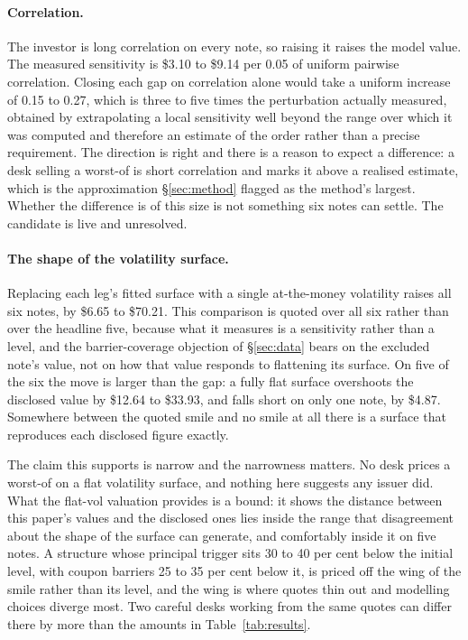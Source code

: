 \paragraph{Correlation.} The investor is long correlation on every note, so
raising it raises the model value. The measured sensitivity is \$3.10 to \$9.14
per 0.05 of uniform pairwise correlation. Closing each gap on correlation alone
would take a uniform increase of 0.15 to 0.27, which is three to five times the
perturbation actually measured, obtained by extrapolating a local sensitivity
well beyond the range over which it was computed and therefore an estimate of
the order rather than a precise requirement. The direction is right and there is
a reason to expect a difference: a desk selling a worst-of is short correlation
and marks it above a realised estimate, which is the approximation
\S\ref{sec:method} flagged as the method's largest. Whether the difference is
of this size is not something six notes can settle. The candidate is live and
unresolved.

\paragraph{The shape of the volatility surface.} Replacing each leg's fitted
surface with a single at-the-money volatility raises all six notes, by \$6.65
to \$70.21. This comparison is quoted over all six rather than over the
headline five, because what it measures is a sensitivity rather than a level,
and the barrier-coverage objection of \S\ref{sec:data} bears on the excluded
note's value, not on how that value responds to flattening its surface. On five
of the six the move is larger than the gap: a fully flat surface overshoots the
disclosed value by \$12.64 to \$33.93, and falls short on only one note, by
\$4.87. Somewhere between the quoted smile and no smile at all
there is a surface that reproduces each disclosed figure exactly.

The claim this supports is narrow and the narrowness matters. No desk prices a
worst-of on a flat volatility surface, and nothing here suggests any issuer
did. What the flat-vol valuation provides is a bound: it shows the distance
between this paper's values and the disclosed ones lies inside the range that
disagreement about the shape of the surface can generate, and comfortably
inside it on five notes. A structure whose principal trigger sits 30 to 40 per
cent below the initial level, with coupon barriers 25 to 35 per cent below it,
is priced off the wing of the smile rather than its level, and
the wing is where quotes thin out and modelling choices diverge most. Two
careful desks working from the same quotes can differ there by more than the
amounts in Table~\ref{tab:results}.


